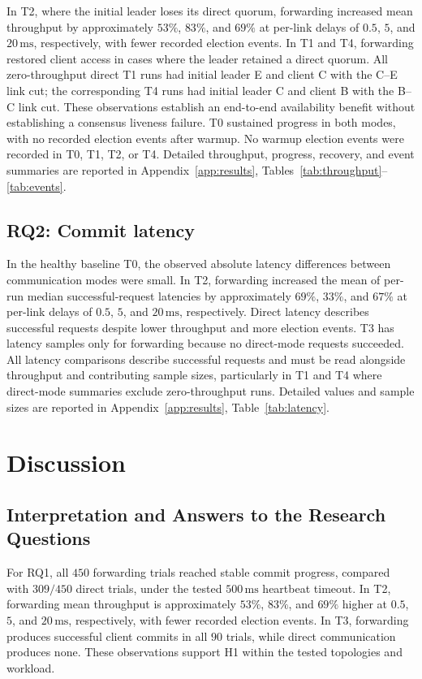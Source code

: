 \documentclass[11pt,a4paper]{article}
\begin{document}
In T2, where the initial leader loses its direct quorum, forwarding increased mean throughput by approximately \(53\%\), \(83\%\), and \(69\%\) at per-link delays of \(0.5\), \(5\), and \(20\,\mathrm{ms}\), respectively, with fewer recorded election events.
In T1 and T4, forwarding restored client access in cases where the leader retained a direct quorum.
All zero-throughput direct T1 runs had initial leader E and client C with the C--E link cut; the corresponding T4 runs had initial leader C and client B with the B--C link cut.
These observations establish an end-to-end availability benefit without establishing a consensus liveness failure.
T0 sustained progress in both modes, with no recorded election events after warmup.
No warmup election events were recorded in T0, T1, T2, or T4.
Detailed throughput, progress, recovery, and event summaries are reported in Appendix~\ref{app:results}, Tables~\ref{tab:throughput}--\ref{tab:events}.

\subsection{RQ2: Commit latency}

In the healthy baseline T0, the observed absolute latency differences between communication modes were small.
In T2, forwarding increased the mean of per-run median successful-request latencies by approximately \(69\%\), \(33\%\), and \(67\%\) at per-link delays of \(0.5\), \(5\), and \(20\,\mathrm{ms}\), respectively.
Direct latency describes successful requests despite lower throughput and more election events.
T3 has latency samples only for forwarding because no direct-mode requests succeeded.
All latency comparisons describe successful requests and must be read alongside throughput and contributing sample sizes, particularly in T1 and T4 where direct-mode summaries exclude zero-throughput runs.
Detailed values and sample sizes are reported in Appendix~\ref{app:results}, Table~\ref{tab:latency}.

\section{Discussion}

\subsection{Interpretation and Answers to the Research Questions}

For RQ1, all \(450\) forwarding trials reached stable commit progress, compared with \(309/450\) direct trials, under the tested \(500\,\mathrm{ms}\) heartbeat timeout. 
In T2, forwarding mean throughput is approximately \(53\%\), \(83\%\), and \(69\%\) higher at \(0.5\), \(5\), and \(20\,\mathrm{ms}\), respectively, with fewer recorded election events. 
In T3, forwarding produces successful client commits in all \(90\) trials, while direct communication produces none. 
These observations support H1 within the tested topologies and workload. 
\end{document}
